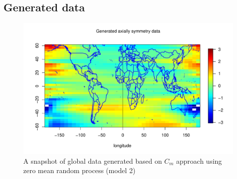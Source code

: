 % 

% 
% 
% 



\subsection{\bf Generated data}

\begin{figure}[H]
	\centering
		\includegraphics [width=1\textwidth ]{graphs/Data_sample_120_model2_withmap.pdf}
		\caption[A snapshot of global data generated based]{A snapshot of global data generated based on $C_m$ approach using zero mean random process (model 2)}
		\label{grid_plot_model_2}
\end{figure}

